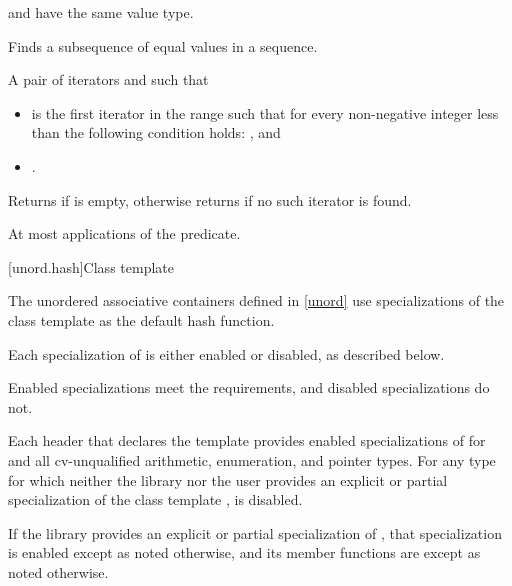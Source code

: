 \begin{itemdescr}
\pnum
\mandates
{} and 
have the same value type.

\pnum
\effects
Finds a subsequence of equal values in a sequence.

\pnum
\returns
A pair of iterators  and  such that
\begin{itemize}
\item {} is the first iterator  in the range
 such that
for every non-negative integer  less than 
the following condition holds:
, and
\item {}.
\end{itemize}
Returns  if  is empty,
otherwise returns  if no such iterator is found.

\pnum
\complexity
At most  applications of the predicate.
\end{itemdescr}

[unord.hash]{Class template }

\pnum
{}%
%
The unordered associative containers defined in \ref{unord} use
specializations of the class template 
as the default hash function.

\pnum
Each specialization of  is either enabled or disabled,
as described below.
\begin{note}
Enabled specializations meet the  requirements, and
disabled specializations do not.
\end{note}
Each header that declares the template 
provides enabled specializations of  for  and
all cv-unqualified arithmetic, enumeration, and pointer types.
For any type  for which neither the library nor the user provides
an explicit or partial specialization of the class template ,
 is disabled.

\pnum
If the library provides an explicit or partial specialization of ,
that specialization is enabled except as noted otherwise,
and its member functions are  except as noted otherwise.

